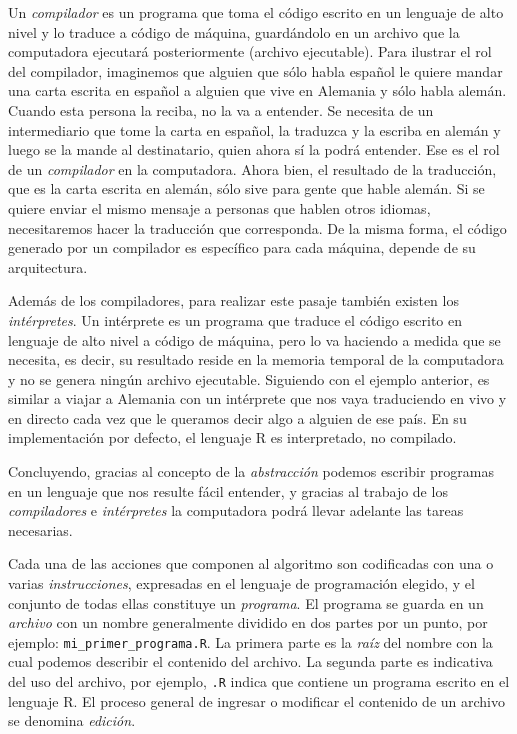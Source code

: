 \documentclass[
]{book}
\begin{document}
Un \emph{compilador} es un programa que toma el código escrito en un lenguaje de alto nivel y lo traduce a código de máquina, guardándolo en un archivo que la computadora ejecutará posteriormente (archivo ejecutable). Para ilustrar el rol del compilador, imaginemos que alguien que sólo habla español le quiere mandar una carta escrita en español a alguien que vive en Alemania y sólo habla alemán. Cuando esta persona la reciba, no la va a entender. Se necesita de un intermediario que tome la carta en español, la traduzca y la escriba en alemán y luego se la mande al destinatario, quien ahora sí la podrá entender. Ese es el rol de un \emph{compilador} en la computadora. Ahora bien, el resultado de la traducción, que es la carta escrita en alemán, sólo sive para gente que hable alemán. Si se quiere enviar el mismo mensaje a personas que hablen otros idiomas, necesitaremos hacer la traducción que corresponda. De la misma forma, el código generado por un compilador es específico para cada máquina, depende de su arquitectura.

Además de los compiladores, para realizar este pasaje también existen los \emph{intérpretes}. Un intérprete es un programa que traduce el código escrito en lenguaje de alto nivel a código de máquina, pero lo va haciendo a medida que se necesita, es decir, su resultado reside en la memoria temporal de la computadora y no se genera ningún archivo ejecutable. Siguiendo con el ejemplo anterior, es similar a viajar a Alemania con un intérprete que nos vaya traduciendo en vivo y en directo cada vez que le queramos decir algo a alguien de ese país. En su implementación por defecto, el lenguaje R es interpretado, no compilado.

Concluyendo, gracias al concepto de la \emph{abstracción} podemos escribir programas en un lenguaje que nos resulte fácil entender, y gracias al trabajo de los \emph{compiladores} e \emph{intérpretes} la computadora podrá llevar adelante las tareas necesarias.

Cada una de las acciones que componen al algoritmo son codificadas con una o varias \emph{instrucciones}, expresadas en el lenguaje de programación elegido, y el conjunto de todas ellas constituye un \emph{programa}. El programa se guarda en un \emph{archivo} con un nombre generalmente dividido en dos partes por un punto, por ejemplo: \texttt{mi\_primer\_programa.R}. La primera parte es la \emph{raíz} del nombre con la cual podemos describir el contenido del archivo. La segunda parte es indicativa del uso del archivo, por ejemplo, \texttt{.R} indica que contiene un programa escrito en el lenguaje R. El proceso general de ingresar o modificar el contenido de un archivo se denomina \emph{edición}.
\end{document}
